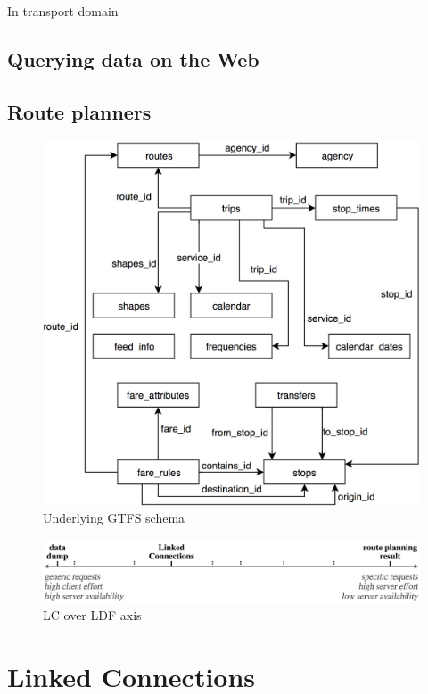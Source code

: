 \documentclass[sw]{iosart2x}
\begin{document}
In transport domain


\subsection{Querying data on the Web}

\subsection{Route planners}



\begin{figure}[h]
	\centering
	\includegraphics[width=1.0\linewidth]{images/gtfsmodel.png}
	\caption{Underlying GTFS schema}
	\label{fig:gtfs}
\end{figure}

\begin{figure}[h]
	\centering
	\includegraphics[width=1.0\linewidth]{images/lc.png}
	\caption{LC over LDF axis}
	\label{fig:lc}
\end{figure}


\section{Linked Connections}
\end{document}
